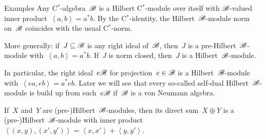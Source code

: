 \documentclass[b]{subfiles}
\begin{document}
\begin{parsec}
\begin{point}{Examples}
Any C$^*$-algebra~$\mathscr{B}$ is a Hilbert C$^*$-module over itself
    with $\mathscr{B}$-valued inner product~$\left<a,b\right> = a^*b$.
By the C$^*$-identity, the Hilbert~$\mathscr{B}$-module
    norm on~$\mathscr{B}$ coincides with
    the usual C$^*$-norm.

More generally: if~$J \subseteq \mathscr{B}$
    is any right ideal of~$\mathscr{B}$,
    then~$J$ is a pre-Hilbert~$\mathscr{B}$-module
    with~$\left<a,b\right> = a^*b$.
If~$J$ is norm closed, then~$J$ is a Hilbert~$\mathscr{B}$-module.

In particular, the right ideal~$e \mathscr{B}$ for projection~$e \in \mathscr{B}$
    is a Hilbert~$\mathscr{B}$-module with~$\left<ea,eb\right> = a^*eb$.
Later we will see that every so-called self-dual
    Hilbert~$\mathscr{B}$-module is build up from such~$e \mathscr{B}$
    if~$\mathscr{B}$ is a von Neumann algebra.
    
If~$X$ and~$Y$ are (pre-)Hilbert~$\mathscr{B}$-modules,
    then its direct sum~$X \oplus Y$
    is a (pre-)Hilbert~$\mathscr{B}$-module
    with inner product~$\left<(x,y), (x',y')\right>
                = \left<x,x'\right>+\left<y,y'\right>$.
\end{point}
\end{parsec}
\end{document}
